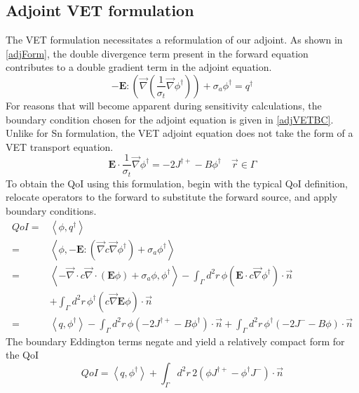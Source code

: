 \documentclass{article}
\newcommand{\vr}{\vec{r}}
\newcommand{\bra}{\left\langle}
\newcommand{\ket}{\right\rangle}
\newcommand{\vdiv}{\vec{\nabla} \cdot}
\newcommand{\vgrad}{\vec{\nabla}}
\newcommand{\Edd}{\mathbf{E}}
\newcommand{\sigt}{\sigma_t}
\newcommand{\siga}{\sigma_a}
\newcommand{\isigt}{c}
\newcommand{\scalSource}{q}
\newcommand{\scalResp}{q^\dag}
\begin{document}
\subsection{Adjoint VET formulation}

The VET formulation necessitates a reformulation of our adjoint. As shown in \ref{adjForm}, the double divergence term present in the forward equation contributes to a double gradient term in the adjoint equation.
\begin{equation}
\label{adjForm}
- \Edd : \left( \vgrad \left( \frac{1}{\sigt}\vgrad \phi^\dag \right) \right) + \siga \phi^\dag = \scalResp
\end{equation}
For reasons that will become apparent during sensitivity calculations, the boundary condition chosen for the adjoint equation is given in \ref{adjVETBC}. Unlike for Sn formulation, the VET adjoint equation does not take the form of a VET transport equation.
\begin{equation}
\label{adjVETBC}
\Edd \cdot \frac{1}{\sigma_{t} } \vec{\nabla} \phi^\dag  = - 2J^{\dag +} - B \phi^\dag \quad \vr \in \Gamma
\end{equation}
To obtain the QoI using this formulation, begin with the typical QoI definition, relocate operators to the forward to substitute the forward source, and apply boundary conditions.
\begin{equation}
\label{VETQoIAdjUnpDeriv}
\begin{split}
QoI=&\bra \phi , \scalResp \ket \\
=&\bra \phi , - \Edd : \left( \vgrad \isigt \vgrad \phi^\dag \right) + \siga \phi^\dag \ket \\
=& \bra - \vdiv \isigt \vdiv \left( \Edd \phi \right) + \siga \phi, \phi^\dag \ket 
- \int_\Gamma d^2 r \, \phi \left( \Edd \cdot \isigt \vgrad \phi^\dag \right) \cdot \vec{n}  \\ 
&+ \int_\Gamma d^2 r \, \phi^\dag \left(  \isigt \vgrad \Edd \phi \right) \cdot \vec{n} \\
=&\bra \scalSource , \phi^\dag \ket 
- \int_\Gamma d^2 r \, \phi \left( - 2J^{\dag +} - B \phi^\dag \right) \cdot \vec{n} + \int_\Gamma d^2 r \, \phi^\dag \left( - 2J^- - B \phi  \right) \cdot \vec{n}
\end{split}
\end{equation}
The boundary Eddington terms negate and yield a relatively compact form for the QoI
\begin{equation}
\label{VETQoIAdj}
QoI=\bra \scalSource , \phi^\dag \ket 
+ \int_\Gamma d^2 r \, 2  \left( \phi J^{\dag +}  - \phi^\dag J^- \right) \cdot \vec{n}
\end{equation}
\end{document}
